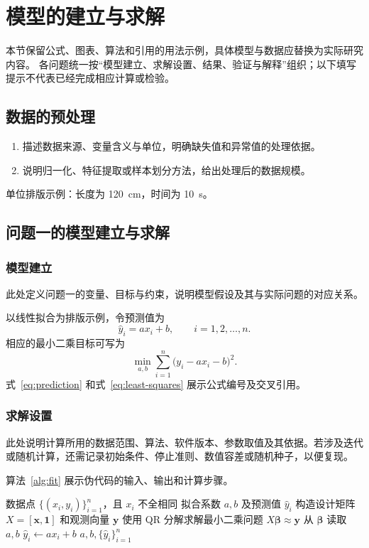 \section{模型的建立与求解}
本节保留公式、图表、算法和引用的用法示例，具体模型与数据应替换为实际研究内容。
各问题统一按“模型建立、求解设置、结果、验证与解释”组织；以下填写提示不代表已经完成相应计算或检验。

\subsection{数据的预处理}
\begin{enumerate}
  \item 描述数据来源、变量含义与单位，明确缺失值和异常值的处理依据。
  \item 说明归一化、特征提取或样本划分方法，给出处理后的数据规模。
\end{enumerate}
单位排版示例：长度为 \SI{120}{\centi\metre}，时间为 \SI{10}{\second}。

\subsection{问题一的模型建立与求解}
\subsubsection{模型建立}
此处定义问题一的变量、目标与约束，说明模型假设及其与实际问题的对应关系。

以线性拟合为排版示例，令预测值为
\begin{equation}
  \hat{y}_i = a x_i + b,\qquad i=1,2,\ldots,n.
  \label{eq:prediction}
\end{equation}
相应的最小二乘目标可写为
\begin{equation}
  \min_{a,b}\sum_{i=1}^{n}\bigl(y_i-a x_i-b\bigr)^2.
  \label{eq:least-squares}
\end{equation}
式~\eqref{eq:prediction} 和式~\eqref{eq:least-squares} 展示公式编号及交叉引用。

\subsubsection{求解设置}
此处说明计算所用的数据范围、算法、软件版本、参数取值及其依据。若涉及迭代或随机计算，还需记录初始条件、停止准则、数值容差或随机种子，以便复现。

算法~\ref{alg:fit} 展示伪代码的输入、输出和计算步骤。
\begin{algorithm}[htbp]
  \caption{线性拟合示例}
  \label{alg:fit}
  \begin{algorithmic}[1]
    \Require 数据点 $\{(x_i,y_i)\}_{i=1}^{n}$，且 $x_i$ 不全相同
    \Ensure 拟合系数 $a,b$ 及预测值 $\hat{y}_i$
    \State 构造设计矩阵 $X=[\bm{x},\bm{1}]$ 和观测向量 $\bm{y}$
    \State 使用 QR 分解求解最小二乘问题 $X\bm{\beta}\approx\bm{y}$
    \State 从 $\bm{\beta}$ 读取 $a,b$
      \State $\hat{y}_i\gets a x_i+b$
    \EndFor
    \State \Return $a,b,\{\hat{y}_i\}_{i=1}^{n}$
  \end{algorithmic}
\end{algorithm}

